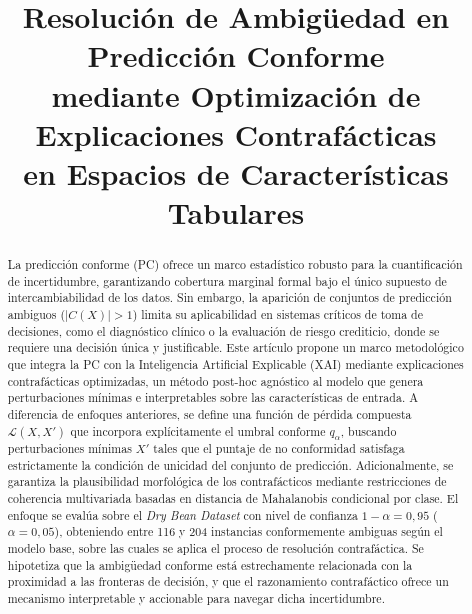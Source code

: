 \documentclass[conference]{IEEEtran}
\begin{document}
\title{Resolución de Ambigüedad en Predicción Conforme\\
mediante Optimización de Explicaciones Contrafácticas\\
en Espacios de Características Tabulares}

\author{
\and
{}
\and
{}
}

\maketitle

\begin{abstract}
La predicción conforme (PC) ofrece un marco estadístico robusto para la
cuantificación de incertidumbre, garantizando cobertura marginal formal
bajo el único supuesto de intercambiabilidad de los datos. Sin embargo,
la aparición de conjuntos de predicción ambiguos ($|C(X)| > 1$) limita
su aplicabilidad en sistemas críticos de toma de decisiones, como el
diagnóstico clínico o la evaluación de riesgo crediticio, donde se
requiere una decisión única y justificable. Este artículo propone un
marco metodológico que integra la PC con la Inteligencia Artificial
Explicable (XAI) mediante explicaciones contrafácticas optimizadas, un
método post-hoc agnóstico al modelo que genera perturbaciones mínimas
e interpretables sobre las características de entrada. A diferencia de
enfoques anteriores, se define una función de pérdida compuesta
$\mathcal{L}(X, X')$ que incorpora explícitamente el umbral conforme
$q_\alpha$, buscando perturbaciones mínimas $X'$ tales que el puntaje
de no conformidad satisfaga estrictamente la condición de unicidad del
conjunto de predicción. Adicionalmente, se garantiza la plausibilidad
morfológica de los contrafácticos mediante restricciones de coherencia
multivariada basadas en distancia de Mahalanobis condicional por clase.
El enfoque se evalúa sobre el \textit{Dry Bean Dataset} con nivel de
confianza $1-\alpha = 0{,}95$ ($\alpha = 0{,}05$), obteniendo entre 116
y 204 instancias conformemente ambiguas según el modelo base, sobre las
cuales se aplica el proceso de resolución contrafáctica. Se hipotetiza
que la ambigüedad conforme está estrechamente relacionada con la
proximidad a las fronteras de decisión, y que el razonamiento
contrafáctico ofrece un mecanismo interpretable y accionable para
navegar dicha incertidumbre.
\end{abstract}
\end{document}
